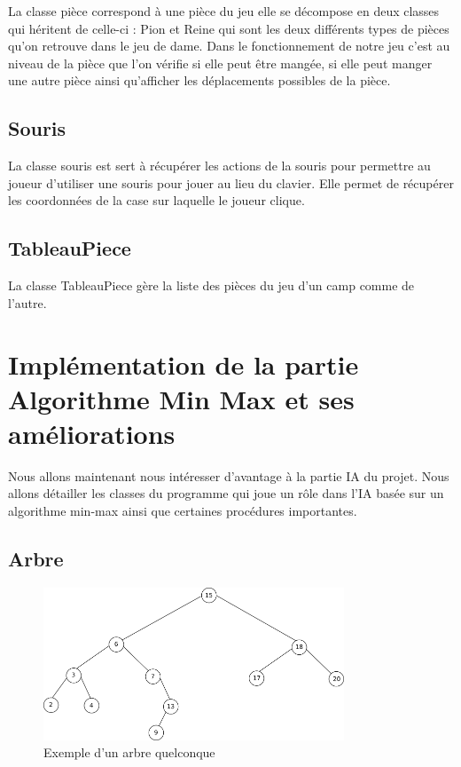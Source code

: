 \documentclass[12,french]{report}
\begin{document}
La classe pièce correspond à une pièce du jeu elle se décompose en deux classes qui héritent de celle-ci : Pion et Reine qui sont les deux différents types de pièces qu'on retrouve dans le jeu de dame. Dans le fonctionnement de notre jeu c'est au niveau de la pièce que l'on vérifie si elle peut être mangée, si elle peut manger une autre pièce ainsi qu'afficher les déplacements possibles de la pièce.

\subsection{Souris}

La classe souris est sert à récupérer les actions de la souris pour permettre au joueur d'utiliser une souris pour jouer au lieu du clavier. Elle permet de récupérer les coordonnées de la case sur laquelle le joueur clique. 

\subsection{TableauPiece}

La classe TableauPiece gère la liste des pièces du jeu d'un camp comme de l'autre.


\section{Implémentation de la partie Algorithme Min Max et ses améliorations}

Nous allons maintenant nous intéresser d'avantage à la partie IA du projet. Nous allons détailler les classes du programme qui joue un rôle dans l'IA basée sur un algorithme min-max ainsi que certaines procédures importantes.

\subsection{Arbre}

\begin{figure}[H]
	\center
	\includegraphics[width=0.8\textwidth]{./Images/arbre}
	\caption{Exemple d'un arbre quelconque}
\end{figure}\vspace{0.2cm}
\end{document}
